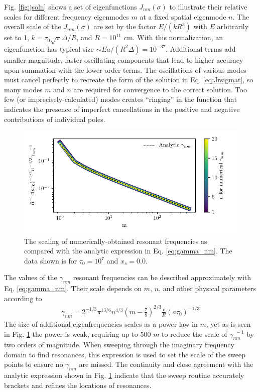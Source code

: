 \documentclass{aastex63}
\newcommand{\be}{\begin{eqnarray}}
\newcommand{\ee}{\end{eqnarray}}
\begin{document}
Fig. \ref{fig:jsoln} shows a set of eigenfunctions $J_{nm}(\sigma)$ to illustrate their relative scales for different frequency eigenmodes $m$ at a fixed spatial eigenmode $n$. The overall scale of the $J_{nm}(\sigma)$ are set by the factor $E/(kR^3)$ with $E$ arbitrarily set to 1, $k = \tau_0 \sqrt{\pi} \Delta / R$, and $R = 10^{11}$ cm. With this normalization, an eigenfunction has typical size ${\sim} E a / \left(R^2 \Delta \right) = 10^{-37}$. Additional terms add smaller-magnitude, faster-oscillating components that lead to higher accuracy upon summation with the lower-order terms. The oscillations of various modes must cancel perfectly to recreate the form of the solution in Eq. \ref{eq:Jrsigmat}, so many modes $m$ and $n$ are required for convergence to the correct solution. Too few (or imprecisely-calculated) modes creates ``ringing'' in the function that indicates the presence of imperfect cancellations in the positive and negative contributions of individual poles. 
\begin{figure}
    \centering
    \includegraphics[width=\textwidth]{gamma_nm.pdf}
    \caption{The scaling of numerically-obtained resonant frequencies as compared with the analytic expression in Eq. \ref{eq:gamma_nm}. The data shown is for $\tau_0=10^7$ and $x_s=0.0$.}
    \label{fig:gamma_nm}
\end{figure}
The values of the $\gamma_{nm}$ resonant frequencies can be described approximately with Eq. \ref{eq:gamma_nm}. Their scale depends on $m$, $n$, and other physical parameters according to 
\be \label{eq:gamma_nm}
\gamma_{nm} = 2^{-1/3} \pi^{13/6} n^{4/3}\left(m-\frac{7}{8}\right)^{2/3}\frac{c}{R}(a\tau_0)^{-1/3} 
\ee
The size of additional eigenfrequencies scales as a power law in $m$, yet as is seen in Fig. \ref{fig:gamma_nm} the power is weak, requiring up to 500 $m$ to reduce the scale of $\gamma_{nm}^{\ \ -1}$ by two orders of magnitude. When sweeping through the imaginary frequency domain to find resonances, this expression is used to set the scale of the sweep points to ensure no $\gamma_{nm}$ are missed. The continuity and close agreement with the analytic expression shown in Fig. \ref{fig:gamma_nm} indicate that the sweep routine accurately brackets and refines the locations of resonances.
\end{document}
